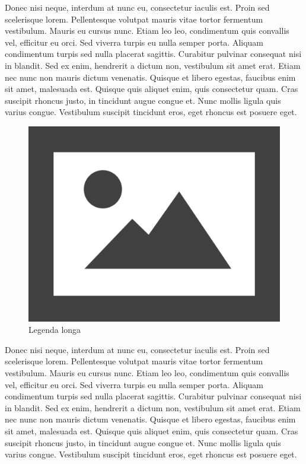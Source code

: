 \documentclass[12pt]{article}
\begin{document}
Donec nisi neque, interdum at nunc eu, consectetur iaculis est. Proin sed scelerisque lorem. Pellentesque volutpat mauris vitae tortor fermentum vestibulum. Mauris eu cursus nunc. Etiam leo leo, condimentum quis convallis vel, efficitur eu orci. Sed viverra turpis eu nulla semper porta. Aliquam condimentum turpis sed nulla placerat sagittis. Curabitur pulvinar consequat nisi in blandit. Sed ex enim, hendrerit a dictum non, vestibulum sit amet erat. Etiam nec nunc non mauris dictum venenatis. Quisque et libero egestas, faucibus enim sit amet, malesuada est. Quisque quis aliquet enim, quis consectetur quam. Cras suscipit rhoncus justo, in tincidunt augue congue et. Nunc mollis ligula quis varius congue. Vestibulum suscipit tincidunt eros, eget rhoncus est posuere eget.

\begin{figure}[H]
	\centering
	\includegraphics[width=0.7\linewidth]{Figuras/fig1}
	\caption[Legenda curta]{Legenda longa}
	\label{fig:figura genérica}
\end{figure}

Donec nisi neque, interdum at nunc eu, consectetur iaculis est. Proin sed scelerisque lorem. Pellentesque volutpat mauris vitae tortor fermentum vestibulum. Mauris eu cursus nunc. Etiam leo leo, condimentum quis convallis vel, efficitur eu orci. Sed viverra turpis eu nulla semper porta. Aliquam condimentum turpis sed nulla placerat sagittis. Curabitur pulvinar consequat nisi in blandit. Sed ex enim, hendrerit a dictum non, vestibulum sit amet erat. Etiam nec nunc non mauris dictum venenatis. Quisque et libero egestas, faucibus enim sit amet, malesuada est. Quisque quis aliquet enim, quis consectetur quam. Cras suscipit rhoncus justo, in tincidunt augue congue et. Nunc mollis ligula quis varius congue. Vestibulum suscipit tincidunt eros, eget rhoncus est posuere eget.
\end{document}
